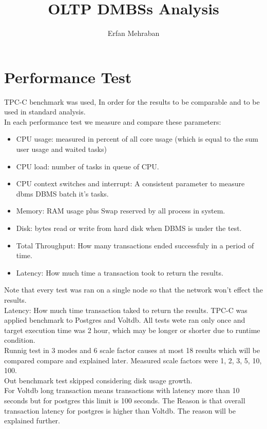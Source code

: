 \documentclass{article}
\author{Erfan Mehraban}
\title{OLTP DMBSs Analysis}
\begin{document}
\maketitle


  
\section{Performance Test}
TPC-C benchmark was used, In order for  the results to be comparable and to be used in standard analysis.\\
In each performance test we measure and compare these parameters:
\begin{itemize}
    \item
    CPU usage: measured in percent of all core usage (which is equal to the sum user usage and waited tasks)
    \item
    CPU load: number of tasks in queue of CPU.
    \item
    CPU context switches and interrupt: A consistent parameter to measure dbms DBMS batch it's tasks.
    \item
    Memory: RAM usage plus Swap reserved by all process in system.
    \item
    Disk: bytes read or write from hard disk when DBMS is under the test.
    \item
    Total Throughput: How many transactions ended successfuly in a period of time.
    \item
    Latency: How much time a transaction took to return the results.
\end{itemize}
Note that every test was ran on a single node so that the network won't effect the results.\\
    Latency: How much time transaction taked to return the results.
    TPC-C was applied benchmark to Postgres and Voltdb. All tests wete ran only once and target execution time was 2 hour, which may be longer or shorter due to runtime condition.\\

    Runnig test in 3 modes and 6 scale factor causes at most 18 results which will be compared compare and explained later. Measured scale factors were 1, 2, 3, 5, 10, 100. \\
    Out benchmark test skipped considering disk usage growth. \\
    For Voltdb long transaction means transactions with latency more than 10 seconds but for postgres this limit is 100 seconds. The Reason is that overall transaction latency for postgres is higher than Voltdb. The reason will be explained further. \\
\end{document}
